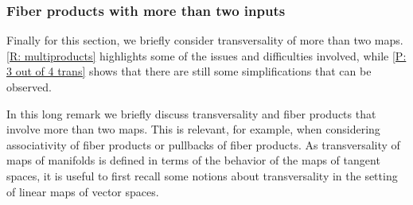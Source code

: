 \subsubsection{Fiber products with more than two inputs}

Finally for this section, we briefly consider transversality of more than two maps. \cref{R: multiproducts} highlights some of the issues and difficulties involved, while \cref{P: 3 out of 4 trans} shows that there are still some simplifications that can be observed.

\begin{remark}\label{R: multiproducts}
	In this long remark we briefly discuss transversality and fiber products that involve more than two maps.
	This is relevant, for example, when considering associativity of fiber products or pullbacks of fiber products.
	As transversality of maps of manifolds is defined in terms of the behavior of the maps of tangent spaces, it is useful to first recall some notions about transversality in the setting of linear maps of vector spaces.


\end{remark}
